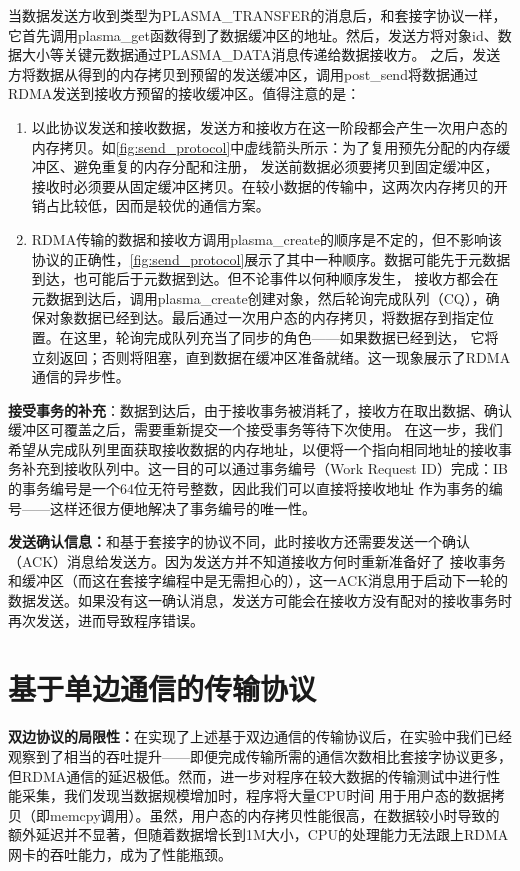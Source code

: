 当数据发送方收到类型为PLASMA\_TRANSFER的消息后，和套接字协议一样，它首先调用plasma\_get函数得到了数据缓冲区的地址。然后，发送方将对象id、数据大小等关键元数据通过PLASMA\_DATA消息传递给数据接收方。
之后，发送方将数据从得到的内存拷贝到预留的发送缓冲区，调用post\_send将数据通过RDMA发送到接收方预留的接收缓冲区。值得注意的是：

\begin{enumerate}
	\item 以此协议发送和接收数据，发送方和接收方在这一阶段都会产生一次用户态的内存拷贝。如\autoref{fig:send_protocol}中虚线箭头所示：为了复用预先分配的内存缓冲区、避免重复的内存分配和注册，
	发送前数据必须要拷贝到固定缓冲区，接收时必须要从固定缓冲区拷贝。在较小数据的传输中，这两次内存拷贝的开销占比较低，因而是较优的通信方案。
	\item RDMA传输的数据和接收方调用plasma\_create的顺序是不定的，但不影响该协议的正确性，\autoref{fig:send_protocol}展示了其中一种顺序。数据可能先于元数据到达，也可能后于元数据到达。但不论事件以何种顺序发生，
	接收方都会在元数据到达后，调用plasma\_create创建对象，然后轮询完成队列（CQ），确保对象数据已经到达。最后通过一次用户态的内存拷贝，将数据存到指定位置。在这里，轮询完成队列充当了同步的角色——如果数据已经到达，
	它将立刻返回；否则将阻塞，直到数据在缓冲区准备就绪。这一现象展示了RDMA通信的异步性。
\end{enumerate}

\textbf{接受事务的补充}：数据到达后，由于接收事务被消耗了，接收方在取出数据、确认缓冲区可覆盖之后，需要重新提交一个接受事务等待下次使用。
在这一步，我们希望从完成队列里面获取接收数据的内存地址，以便将一个指向相同地址的接收事务补充到接收队列中。这一目的可以通过事务编号（Work Request ID）完成：IB的事务编号是一个64位无符号整数，因此我们可以直接将接收地址
作为事务的编号——这样还很方便地解决了事务编号的唯一性。

\textbf{发送确认信息：}和基于套接字的协议不同，此时接收方还需要发送一个确认（ACK）消息给发送方。因为发送方并不知道接收方何时重新准备好了
接收事务和缓冲区（而这在套接字编程中是无需担心的），这一ACK消息用于启动下一轮的数据发送。如果没有这一确认消息，发送方可能会在接收方没有配对的接收事务时再次发送，进而导致程序错误。

\section{基于单边通信的传输协议}

\textbf{双边协议的局限性：}在实现了上述基于双边通信的传输协议后，在实验中我们已经观察到了相当的吞吐提升——即便完成传输所需的通信次数相比套接字协议更多，但RDMA通信的延迟极低。然而，进一步对程序在较大数据的传输测试中进行性能采集，我们发现当数据规模增加时，程序将大量CPU时间
用于用户态的数据拷贝（即memcpy调用）。虽然，用户态的内存拷贝性能很高，在数据较小时导致的额外延迟并不显著，但随着数据增长到1M大小，CPU的处理能力无法跟上RDMA网卡的吞吐能力，成为了性能瓶颈。

